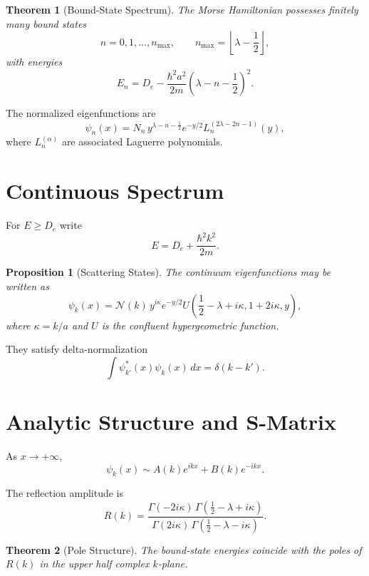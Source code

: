 \documentclass[11pt]{article}
\newtheorem{theorem}{Theorem}
\newtheorem{proposition}{Proposition}
\begin{document}
\begin{theorem}[Bound-State Spectrum]
The Morse Hamiltonian possesses finitely many bound states
\[
n=0,1,\dots,n_{\max},\qquad
n_{\max}=\left\lfloor\lambda-\frac12\right\rfloor,
\]
with energies
\begin{equation}
E_n
=
D_e-\frac{\hbar^2 a^2}{2m}
\left(\lambda-n-\frac12\right)^2.
\end{equation}
\end{theorem}

The normalized eigenfunctions are
\begin{equation}
\psi_n(x)
=
N_n\,
y^{\lambda-n-\frac12}
e^{-y/2}
L_n^{(2\lambda-2n-1)}(y),
\end{equation}
where $L_n^{(\alpha)}$ are associated Laguerre polynomials.

\section{Continuous Spectrum}

For $E\ge D_e$ write
\[
E=D_e+\frac{\hbar^2 k^2}{2m}.
\]

\begin{proposition}[Scattering States]
The continuum eigenfunctions may be written as
\begin{equation}
\psi_k(x)
=
\mathcal N(k)\,
y^{i\kappa}e^{-y/2}
U\!\left(
\frac12-\lambda+i\kappa,
1+2i\kappa,
y
\right),
\end{equation}
where $\kappa=k/a$ and $U$ is the confluent hypergeometric function.
\end{proposition}

They satisfy delta-normalization
\[
\int \psi_{k'}^*(x)\psi_k(x)\,dx=\delta(k-k').
\]

\section{Analytic Structure and S-Matrix}

As $x\to+\infty$,
\[
\psi_k(x)\sim
A(k)e^{ikx}+B(k)e^{-ikx}.
\]

The reflection amplitude is
\begin{equation}
R(k)=
\frac{\Gamma(-2i\kappa)
\,\Gamma(\frac12-\lambda+i\kappa)}
{\Gamma(2i\kappa)
\,\Gamma(\frac12-\lambda-i\kappa)}.
\end{equation}

\begin{theorem}[Pole Structure]
The bound-state energies coincide with the poles of $R(k)$
in the upper half complex $k$-plane.
\end{theorem}
\end{document}
